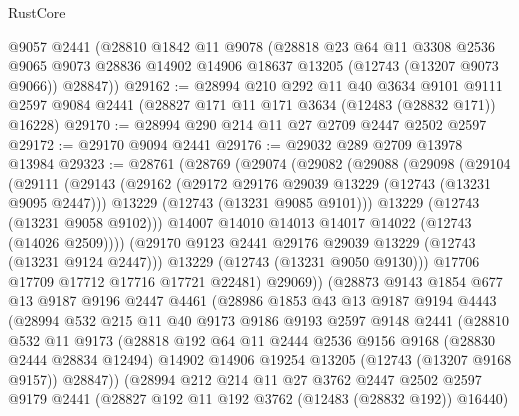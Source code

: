 \begin{lexlean}{RustCore}
\begin{coremodule}
    @9057
    @2441
    (@28810
      @1842
      @11
      @9078
      (@28818
        @23
        @64
        @11
        @3308
        @2536
        @9065
        @9073
        @28836
        @14902
        @14906
        @18637
        @13205
        (@12743 (@13207 @9073 @9066))
        @28847))
@29162 := @28994
    @210
    @292
    @11
    @40
    @3634
    @9101
    @9111
    @2597
    @9084
    @2441
    (@28827 @171 @11 @171 @3634 (@12483 (@28832 @171)) @16228)
@29170 := @28994 @290 @214 @11 @27 @2709 @2447 @2502 @2597
@29172 := @29170 @9094 @2441
@29176 := @29032 @289 @2709 @13978 @13984
@29323 := @28761
    (@28769
      (@29074
        (@29082
          (@29088
            (@29098
              (@29104
                (@29111
                  (@29143
                    (@29162
                      (@29172 @29176 @29039 @13229 (@12743 (@13231 @9095 @2447)))
                      @13229
                      (@12743 (@13231 @9085 @9101)))
                    @13229
                    (@12743 (@13231 @9058 @9102)))
                  @14007
                  @14010
                  @14013
                  @14017
                  @14022
                  (@12743 (@14026 @2509))))
              (@29170 @9123 @2441 @29176 @29039 @13229 (@12743 (@13231 @9124 @2447)))
              @13229
              (@12743 (@13231 @9050 @9130)))
            @17706
            @17709
            @17712
            @17716
            @17721
            @22481)
          @29069))
      (@28873
        @9143
        @1854
        @677
        @13
        @9187
        @9196
        @2447
        @4461
        (@28986
          @1853
          @43
          @13
          @9187
          @9194
          @4443
          (@28994
            @532
            @215
            @11
            @40
            @9173
            @9186
            @9193
            @2597
            @9148
            @2441
            (@28810
              @532
              @11
              @9173
              (@28818
                @192
                @64
                @11
                @2444
                @2536
                @9156
                @9168
                (@28830 @2444 @28834 @12494)
                @14902
                @14906
                @19254
                @13205
                (@12743 (@13207 @9168 @9157))
                @28847))
            (@28994
              @212
              @214
              @11
              @27
              @3762
              @2447
              @2502
              @2597
              @9179
              @2441
              (@28827 @192 @11 @192 @3762 (@12483 (@28832 @192)) @16440)

\end{coremodule}
\end{lexlean}
